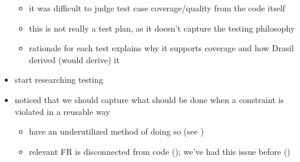 \begin{itemize}
          \begin{itemize}
              \item it was difficult to judge test case coverage/quality from
                    the code itself
              \item this is not really a test plan, as it doesn't capture the
                    testing philosophy
              \item rationale for each test explains why it supports coverage
                    and how Drasil derived (would derive) it
          \end{itemize}
    \item start researching testing
    \item noticed that we should capture what should be done when a constraint
          is violated in a reusable way
          \begin{itemize}
              \item have an underutilized method of doing so (see )
              \item relevant FR is disconnected from code (); we've had
                    this issue before ()
          \end{itemize}
\end{itemize}
